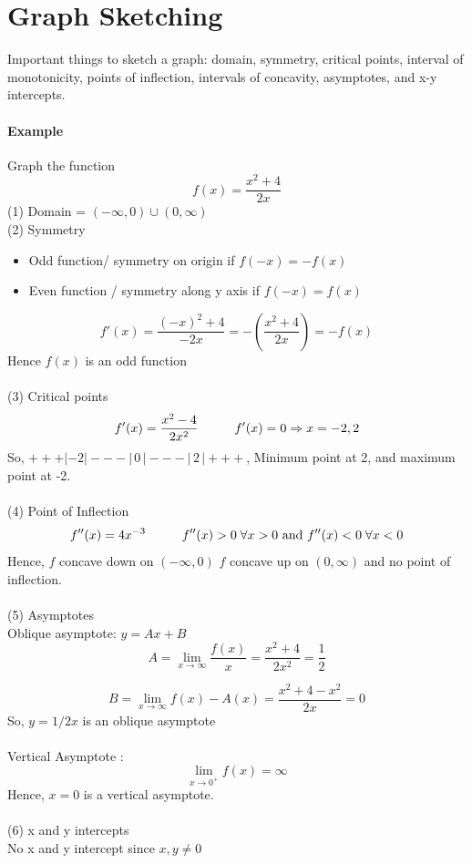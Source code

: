 \documentclass[12pt]{article}
\newcommand\tab[1][1cm]{\hspace*{#1}}
\begin{document}
\section{Graph Sketching}
Important things to sketch a graph: domain, symmetry, critical points, interval of monotonicity, points of inflection,
intervals of concavity, asymptotes, and x-y intercepts.

\paragraph{Example} Graph the function
\[
    f(x) = \frac{x^2 + 4}{2x} 
\]
(1) Domain = $(-\infty, 0) \cup (0, \infty)$ \\
(2) Symmetry \\
\begin{itemize} 
     \item Odd function/ symmetry on origin if $f(-x) = - f(x)$
     \item Even function / symmetry along y axis if $f(-x) = f(x)$
\end{itemize}

\[
    f'(x) = \frac{( - x)^2 + 4}{ - 2x} = - (\frac{x^2 + 4}{2x}) = - f(x) 
\]
Hence $f(x)$ is an odd function \\ \\
(3) Critical points
\[
    f'(x) = \frac{x^2 - 4}{2x^2} \textrm{\tab} f'(x) = 0 \Rightarrow x = {-2, 2} 
\]
So, $+++|-2|---|\,0\,|---|\,2\,|+++$, 
Minimum point at 2, and maximum point at -2. \\ \\
(4) Point of Inflection
\[
    f''(x) = 4x^{ - 3} \textrm{\tab} f''(x) > 0 \; \forall x > 0 \textrm{ and } f''(x) < 0 \; \forall x < 0
\]
Hence, $f$ concave down on $(- \infty, 0)$  $f$ concave up on $(0, \infty)$ and no point of inflection. \\ \\
(5) Asymptotes \\
Oblique asymptote: $y = Ax + B$
\[
    A = \lim_{x \to \infty} \frac{f(x)}{x} = \frac{x^2 + 4}{2x^2} = \frac{1}{2} 
\]

\[
    B = \lim_{x \to \infty} f(x) - A(x)  = \frac{x^2 + 4 - x^2}{2x} = 0 
\]
So, $y = 1/2x$ is an oblique asymptote\\ \\
Vertical Asymptote :
\[
    \lim_{x \to 0^{ +}} f(x) = \infty
\]
Hence, $x = 0$ is a vertical asymptote. \\ \\
(6) x and y intercepts \\
No x and y intercept since $x, y \neq 0$
\end{document}
